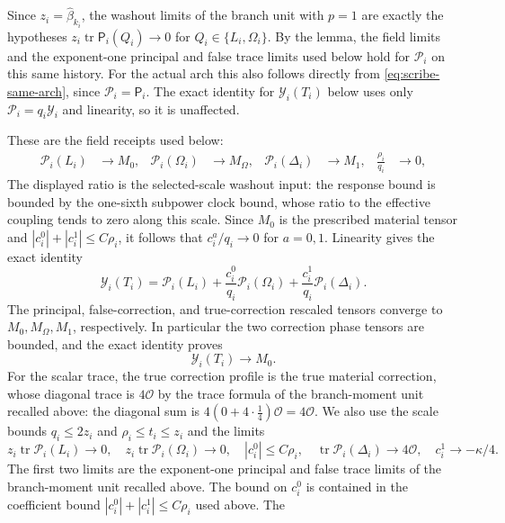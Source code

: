 Since $z_i=\widehat\beta_{k_i}$, the washout limits of the branch unit
with $p=1$ are exactly the hypotheses
$z_i\operatorname{tr}\mathsf P_i(Q_i)\to0$ for $Q_i\in\{L_i,\Omega_i\}$.
By the lemma, the field limits and the exponent-one principal and false
trace limits used below hold for $\mathcal P_i$ on this same history.
For the actual arch this also follows directly from
\eqref{eq:scribe-same-arch}, since $\mathcal P_i=\mathsf P_i$. The exact
identity for $\mathcal Y_i(T_i)$ below uses only
$\mathcal P_i=q_i\mathcal Y_i$ and linearity, so it is unaffected.

These are the field receipts used below:
\begin{align}
 \mathcal P_i(L_i)&\longrightarrow M_0,&
 \mathcal P_i(\Omega_i)&\longrightarrow M_\Omega,&
 \mathcal P_i(\Delta_i)&\longrightarrow M_1,
 &\frac{\rho_i}{q_i}&\longrightarrow0,
 \label{eq:ex-lattice-scribe-field-receipts}
\end{align}
The displayed ratio is the selected-scale washout input: the response bound
is bounded by the one-sixth subpower clock bound, whose ratio to the effective
coupling tends to zero along this scale. Since $M_0$ is the prescribed
material tensor and $|c_i^0|+|c_i^1|\le C\rho_i$, it follows that
$c_i^a/q_i\to0$ for $a=0,1$. Linearity gives
the exact identity
\[
 \mathcal Y_i(T_i)=\mathcal P_i(L_i)
   +\frac{c_i^0}{q_i}\mathcal P_i(\Omega_i)
   +\frac{c_i^1}{q_i}\mathcal P_i(\Delta_i).
\]
The principal, false-correction, and true-correction rescaled tensors converge
to $M_0,M_\Omega,M_1$, respectively.
In particular the two correction phase tensors are bounded, and the exact
identity proves
\begin{equation}
 \mathcal Y_i(T_i)\longrightarrow M_0.
 \label{eq:ex-lattice-scribe-field-limit}
\end{equation}
For the scalar trace, the true correction profile is the true material
correction, whose diagonal trace is $4\mathcal O$ by the trace formula of
the branch-moment unit recalled above: the diagonal sum is
$4(0+4\cdot\frac14)\mathcal O=4\mathcal O$. We also use the scale bounds
$q_i\le2z_i$ and $\rho_i\le t_i\le z_i$ and the limits
\[
 z_i\operatorname{tr}\mathcal P_i(L_i)\to0,\quad
 z_i\operatorname{tr}\mathcal P_i(\Omega_i)\to0,\quad
 |c_i^0|\le C\rho_i,\quad
 \operatorname{tr}\mathcal P_i(\Delta_i)\to4\mathcal O,
 \quad c_i^1\to-\kappa/4.
\]
The first two limits are the exponent-one principal and false trace limits
of the branch-moment unit recalled above. The bound on $c_i^0$ is contained
in the coefficient bound $|c_i^0|+|c_i^1|\le C\rho_i$ used above. The
